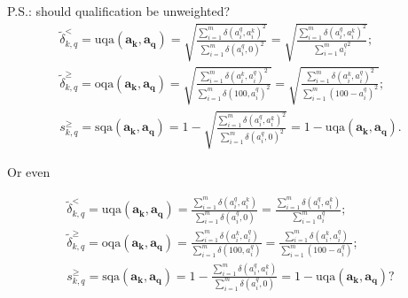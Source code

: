 \documentclass{elsarticle} %
\begin{document}
P.S.: should qualification be unweighted?
\begin{gather}
    \tilde{\delta}_{k,q}^{<} =
    \text{uqa}(\boldsymbol{a_k}, \boldsymbol{a_q}) =
    \sqrt{
    \frac{
    \sum_{i=1}^{m}{
    {\delta(a_{i}^{q}, a_{i}^{k})} ^ 2
    }
    }{
    \sum_{i=1}^{m}{
    {\delta(a_{i}^{q}, 0)} ^ 2
    }
    }
    } =
    \sqrt{
    \frac{
    \sum_{i=1}^{m}{
    {\delta(a_{i}^{q}, a_{i}^{k})} ^ 2
    }
    }{
    \sum_{i=1}^{m}{
    {a_{i}^{q}} ^ 2
    }
    }
    }
    ;\\
    \tilde{\delta}_{k,q}^{\geq} =
    \text{oqa}(\boldsymbol{a_k}, \boldsymbol{a_q}) =
    \sqrt{
    \frac{
    \sum_{i=1}^{m}{
    {\delta(a_{i}^{k}, a_{i}^{q})} ^ 2
    }
    }{
    \sum_{i=1}^{m}{
    {\delta(100, a_{i}^{q})} ^ 2
    }
    }
    } =
    \sqrt{
    \frac{
    \sum_{i=1}^{m}{
    {\delta(a_{i}^{k}, a_{i}^{q})} ^ 2
    }
    }{
    \sum_{i=1}^{m}{
    {(100 - a_{i}^{q})} ^ 2
    }
    }
    }
    ;\\
    s_{k,q}^{\geq} =
    \text{sqa}(\boldsymbol{a_k}, \boldsymbol{a_q}) =
    1 -
    \sqrt{
    \frac{
    \sum_{i=1}^{m}{
    {\delta(a_{i}^{q}, a_{i}^{k})} ^ 2
    }
    }{
    \sum_{i=1}^{m}{
    {\delta(a_{i}^{q}, 0)} ^ 2
    }
    }
    } =
    1 - \text{uqa}(\boldsymbol{a_k}, \boldsymbol{a_q})
    .
\end{gather}

Or even

\begin{gather}
    \tilde{\delta}_{k,q}^{<} =
    \text{uqa}(\boldsymbol{a_k}, \boldsymbol{a_q}) =
    \frac{
    \sum_{i=1}^{m}{
    {\delta(a_{i}^{q}, a_{i}^{k})}
    }
    }{
    \sum_{i=1}^{m}{
    {\delta(a_{i}^{q}, 0)}
    }
    } =
    \frac{
    \sum_{i=1}^{m}{
    {\delta(a_{i}^{q}, a_{i}^{k})}
    }
    }{
    \sum_{i=1}^{m}{
    {a_{i}^{q}}
    }
    }
    ;\\
    \tilde{\delta}_{k,q}^{\geq} =
    \text{oqa}(\boldsymbol{a_k}, \boldsymbol{a_q}) =
    \frac{
    \sum_{i=1}^{m}{
    {\delta(a_{i}^{k}, a_{i}^{q})}
    }
    }{
    \sum_{i=1}^{m}{
    {\delta(100, a_{i}^{q})}
    }
    } =
    \frac{
    \sum_{i=1}^{m}{
    {\delta(a_{i}^{k}, a_{i}^{q})}
    }
    }{
    \sum_{i=1}^{m}{
    {(100 - a_{i}^{q})}
    }
    }
    ;\\
    s_{k,q}^{\geq} =
    \text{sqa}(\boldsymbol{a_k}, \boldsymbol{a_q}) =
    1 -
    \frac{
    \sum_{i=1}^{m}{
    {\delta(a_{i}^{q}, a_{i}^{k})}
    }
    }{
    \sum_{i=1}^{m}{
    {\delta(a_{i}^{q}, 0)}
    }
    } =
    1 - \text{uqa}(\boldsymbol{a_k}, \boldsymbol{a_q})
    ?
\end{gather}
\end{document}
